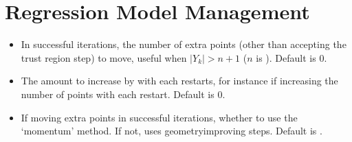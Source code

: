 \documentclass[letterpaper,10pt,english]{sphinxmanual}
\begin{document}
\section{Regression Model Management}
\label{\detokenize{advanced:regression-model-management}}\begin{itemize}
\item {} 
\sphinxAtStartPar
{} \sphinxhyphen{} In successful iterations, the number of extra points (other than accepting the trust region step) to move, useful when \(|Y_k|>n+1\) (\(n\) is ). Default is 0.

\item {} 
\sphinxAtStartPar
{} \sphinxhyphen{} The amount to increase  by with each restarts, for instance if increasing the number of points with each restart. Default is 0.

\item {} 
\sphinxAtStartPar
{} \sphinxhyphen{} If moving extra points in successful iterations, whether to use the ‘momentum’ method. If not, uses geometry\sphinxhyphen{}improving steps. Default is .

\end{itemize}
\end{document}
